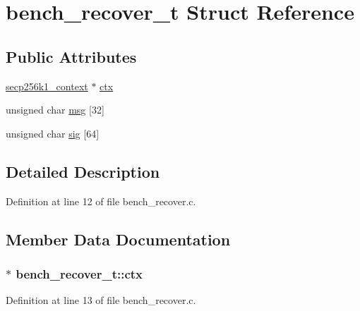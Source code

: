 \hypertarget{structbench__recover__t}{}\section{bench\+\_\+recover\+\_\+t Struct Reference}
\label{structbench__recover__t}
\subsection*{Public Attributes}
\begin{DoxyCompactItemize}
\item 
\hyperlink{secp256k1_8h_a282ec9e6dfec8c35955c3eb2f7476e5e}{secp256k1\+\_\+context} $\ast$ \hyperlink{structbench__recover__t_acc09a09bcc17745c54700b8bc712a6f6}{ctx}
\item 
unsigned char \hyperlink{structbench__recover__t_ae1fb7111eb50d3b09ea073ffa61824ee}{msg} \mbox{[}32\mbox{]}
\item 
unsigned char \hyperlink{structbench__recover__t_a76d1266b30c8d6a55fd52e9bb7c67a85}{sig} \mbox{[}64\mbox{]}
\end{DoxyCompactItemize}


\subsection{Detailed Description}


Definition at line 12 of file bench\+\_\+recover.\+c.



\subsection{Member Data Documentation}
\hypertarget{structbench__recover__t_acc09a09bcc17745c54700b8bc712a6f6}{}
\subsubsection[{ctx}]{$\ast$ bench\+\_\+recover\+\_\+t\+::ctx}\label{structbench__recover__t_acc09a09bcc17745c54700b8bc712a6f6}


Definition at line 13 of file bench\+\_\+recover.\+c.

\hypertarget{structbench__recover__t_ae1fb7111eb50d3b09ea073ffa61824ee}{}
